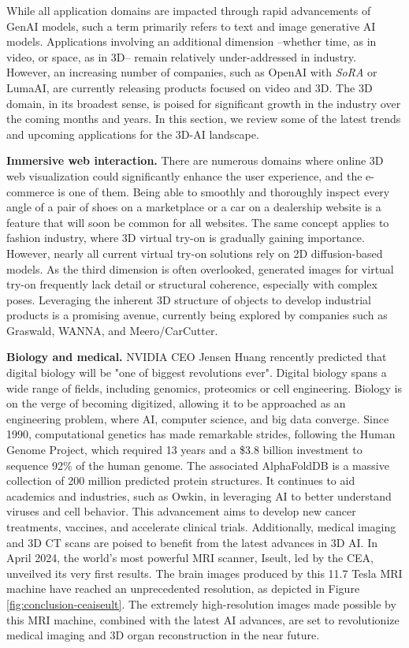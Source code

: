 While all application domains are impacted through rapid advancements of \ac{GenAI} models, such a term primarily refers to text and image generative \ac{AI} models. Applications involving an additional dimension --whether time, as in video, or space, as in 3D-- remain relatively under-addressed in industry. However, an increasing number of companies, such as OpenAI with \textit{SoRA} or LumaAI, are currently releasing products focused on video and 3D. The 3D domain, in its broadest sense, is poised for significant growth in the industry over the coming months and years. In this section, we review some of the latest trends and upcoming applications for the 3D-\ac{AI} landscape. 

\noindent \textbf{Immersive web interaction.} There are numerous domains where online 3D web visualization could significantly enhance the user experience, and the e-commerce is one of them. Being able to smoothly and thoroughly inspect every angle of a pair of shoes on a marketplace or a car on a dealership website is a feature that will soon be common for all websites. The same concept applies to fashion industry, where 3D virtual try-on is gradually gaining importance. However, nearly all current virtual try-on solutions rely on 2D diffusion-based models. As the third dimension is often overlooked, generated images for virtual try-on frequently lack detail or structural coherence, especially with complex poses. Leveraging the inherent 3D structure of objects to develop industrial products is a promising avenue, currently being explored by companies such as Graswald, WANNA, and Meero/CarCutter. 

\noindent \textbf{Biology and medical.} NVIDIA CEO Jensen Huang rencently predicted that digital biology will be "one of biggest revolutions ever". Digital biology spans a wide range of fields, including genomics, proteomics or cell engineering. Biology is on the verge of becoming digitized, allowing it to be approached as an engineering problem, where \ac{AI}, computer science, and big data converge. Since 1990, computational genetics has made remarkable strides, following the Human Genome Project, which required 13 years and a \$3.8 billion investment to sequence 92\% of the human genome. The associated AlphaFoldDB is a massive collection of 200 million predicted protein structures. It continues to aid academics and industries, such as Owkin, in leveraging \ac{AI} to better understand viruses and cell behavior. This advancement aims to develop new cancer treatments, vaccines, and accelerate clinical trials. Additionally, medical imaging and 3D CT scans are poised to benefit from the latest advances in 3D \ac{AI}. In April 2024, the world's most powerful \ac{MRI} scanner, Iseult, led by the CEA, unveilved its very first results. The brain images produced by this 11.7 Tesla \ac{MRI} machine have reached an unprecedented resolution, as depicted in Figure \ref{fig:conclusion-ceaiseult}. The extremely high-resolution images made possible by this MRI machine, combined with the latest \ac{AI} advances, are set to revolutionize medical imaging and 3D organ reconstruction in the near future.

